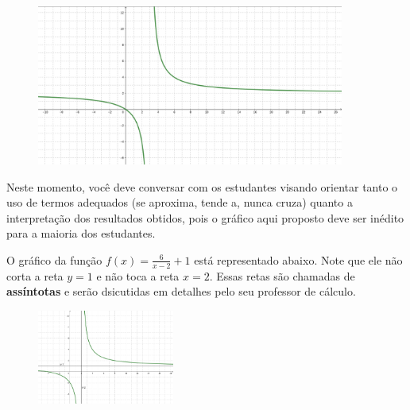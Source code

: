 \documentclass[main.tex]{subfiles}
\begin{document}
\begin{gabarito}
	\begin{gabaritoQuestao}
	
		\begin{figure}[h]
        \centering
        \includegraphics[width=0.9\textwidth]{img/c3r13.png}
        \end{figure}
        
	\end{gabaritoQuestao}
\end{gabarito}

\paraTutores

Neste momento, você deve conversar com os estudantes visando orientar tanto o uso de termos adequados (se aproxima, tende a, nunca cruza) quanto a interpretação dos resultados obtidos, pois o gráfico aqui proposto deve ser inédito para a maioria dos estudantes.

\paraAmbos
\newpage

O gráfico da função $f(x)=\frac{6}{x-2}+1$ está representado abaixo. Note que ele não corta a reta $y=1$ e não toca a reta $x=2$. Essas retas são chamadas de \textbf{assíntotas} e serão dsicutidas em detalhes pelo seu professor de cálculo.

\begin{figure}[h]
\centering
\includegraphics[width=0.4\textwidth]{img/c3q12.png}
\end{figure}
\end{document}
